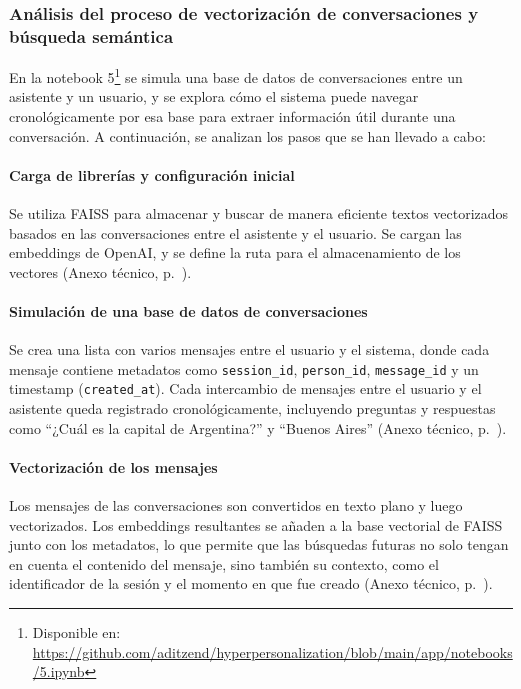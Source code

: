 \subsubsection{Análisis del proceso de vectorización de conversaciones y búsqueda semántica}

En la notebook 5\footnote{Disponible en: \url{https://github.com/aditzend/hyperpersonalization/blob/main/app/notebooks/5.ipynb}} se simula una base de datos de conversaciones entre un asistente y un usuario, y se explora cómo el sistema puede navegar cronológicamente por esa base para extraer información útil durante una conversación. A continuación, se analizan los pasos que se han llevado a cabo:

\paragraph{Carga de librerías y configuración inicial}

Se utiliza FAISS para almacenar y buscar de manera eficiente textos vectorizados basados en las conversaciones entre el asistente y el usuario. Se cargan las embeddings de OpenAI, y se define la ruta para el almacenamiento de los vectores (Anexo técnico, p.~\pageref{anexo:code-4-1-5-1}).

\paragraph{Simulación de una base de datos de conversaciones}

Se crea una lista con varios mensajes entre el usuario y el sistema, donde cada mensaje contiene metadatos como \texttt{session\_id}, \texttt{person\_id}, \texttt{message\_id} y un timestamp (\texttt{created\_at}). Cada intercambio de mensajes entre el usuario y el asistente queda registrado cronológicamente, incluyendo preguntas y respuestas como ``¿Cuál es la capital de Argentina?'' y ``Buenos Aires'' (Anexo técnico, p.~\pageref{anexo:code-4-1-5-2}).

\paragraph{Vectorización de los mensajes}

Los mensajes de las conversaciones son convertidos en texto plano y luego vectorizados. Los embeddings resultantes se añaden a la base vectorial de FAISS junto con los metadatos, lo que permite que las búsquedas futuras no solo tengan en cuenta el contenido del mensaje, sino también su contexto, como el identificador de la sesión y el momento en que fue creado (Anexo técnico, p.~\pageref{anexo:code-4-1-5-3}).

